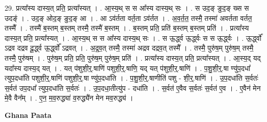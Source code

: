 \documentclass[17pt]{extarticle}
\begin{document}
29. प्रत्या᳚स्य दास्य॒त् प्रति॒ प्रत्या᳚स्यत् । . आ॒स्य॒थ् स स आ᳚स्य दास्य॒थ् सः । . स उद॒ङ् ङुद॒ङ् ख्स स उदङ्॑ । . उद॒ङ् ओद॒ङ् ङुद॒ङ् आ । . आ ऽव॑र्तता वर्त॒ता ऽव॑र्तत । . अ॒व॒र्त॒त॒ तस्मै॒ तस्मा॑ अवर्तता वर्तत॒ तस्मै᳚ । . तस्मै॑ ब॒स्तम् ब॒स्तम् तस्मै॒ तस्मै॑ ब॒स्तम् । . ब॒स्तम् प्रति॒ प्रति॑ ब॒स्तम् ब॒स्तम् प्रति॑ । . प्रत्या᳚स्य दास्य॒त् प्रति॒ प्रत्या᳚स्यत् । . आ॒स्य॒थ् स स आ᳚स्य दास्य॒थ् सः । . स ऊ॒र्द्ध्व ऊ॒र्द्ध्वः स स ऊ॒र्द्ध्वः । . ऊ॒र्द्ध्वो᳚ ऽद्रव दद्रव दू॒र्द्ध्व ऊ॒र्द्ध्वो᳚ ऽद्रवत् । . अ॒द्र॒व॒त् तस्मै॒ तस्मा॑ अद्रव दद्रव॒त् तस्मै᳚ । . तस्मै॒ पुरु॑ष॒म् पुरु॑ष॒म् तस्मै॒ तस्मै॒ पुरु॑षम् । . पुरु॑ष॒म् प्रति॒ प्रति॒ पुरु॑ष॒म् पुरु॑ष॒म् प्रति॑ । . प्रत्या᳚स्य दास्य॒त् प्रति॒ प्रत्या᳚स्यत् । . आ॒स्य॒द् यद् यदा᳚स्य दास्य॒द् यत् । . यत् प॑शुशी॒र्॒.षाणि॑ पशुशी॒र्॒.षाणि॒ यद् यत् प॑शुशी॒र्॒.षाणि॑ । . प॒शु॒शी॒र्॒.षा ण्यु॑प॒दधा᳚ त्युप॒दधा॑ति पशुशी॒र्॒.षाणि॑ पशुशी॒र्॒.षा ण्यु॑प॒दधा॑ति । . प॒शु॒शी॒र्॒.षाणीति॑ पशु - शी॒र्॒.षाणि॑ । . उ॒प॒दधा॑ति स॒र्वतः॑ स॒र्वत॑ उप॒दधा᳚ त्युप॒दधा॑ति स॒र्वतः॑ । . उ॒प॒दधा॒तीत्यु॑प - दधा॑ति । . स॒र्वत॑ ए॒वैव स॒र्वतः॑ स॒र्वत॑ ए॒व । . ए॒वैन॑ मेन मे॒वै वैन᳚म् । . ए॒न॒ म॒व॒रुद्ध्या॑ व॒रुद्ध्यै॑न मेन मव॒रुद्ध्य॑ । \newline

\textbf{Ghana Paata } \newline
\end{document}
